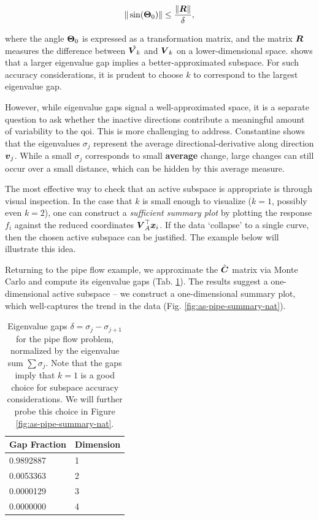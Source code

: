 \documentclass{article}
\begin{document}
\begin{equation} \label{eq:sine-bound}
  \|\sin(\boldsymbol{\Theta}_0)\| \leq \frac{\|\boldsymbol{R}\|}{\delta},
\end{equation}

\noindent where the angle $\boldsymbol{\Theta}_0$ is expressed as a transformation matrix,
and the matrix $\boldsymbol{R}$ measures the difference between $\hat{\boldsymbol{V}_k}$ and $\boldsymbol{V}_k$
on a lower-dimensional space.  shows that a larger
eigenvalue gap implies a better-approximated subspace. For such accuracy
considerations, it is prudent to choose $k$ to correspond to the largest
eigenvalue gap.

However, while eigenvalue gaps signal a well-approximated space, it is a
separate question to ask whether the inactive directions contribute a meaningful
amount of variability to the qoi. This is more challenging to address.
Constantine\cite{constantine2015} shows that the eigenvalues $\sigma_j$
represent the average directional-derivative along direction $\boldsymbol{v}_j$. While a
small $\sigma_j$ corresponds to small \textbf{average} change, large changes can
still occur over a small distance, which can be hidden by this average measure.

The most effective way to check that an active subspace is appropriate is
through visual inspection. In the case that $k$ is small enough to visualize
($k=1$, possibly even $k=2$), one can construct a \emph{sufficient summary
  plot}\cite{cook2009regression} by plotting the response $f_i$ against the
reduced coordinates $\boldsymbol{V}_{A}^{\top}\boldsymbol{x}_i$. If the data `collapse' to a single
curve, then the chosen active subspace can be justified. The example below will
illustrate this idea.

Returning to the pipe flow example, we approximate the $\hat{\boldsymbol{C}}$ matrix via
Monte Carlo and compute its eigenvalue gaps (Tab. \ref{tab:as-pipe-gaps}). The
results suggest a one-dimensional active subspace -- we construct a
one-dimensional summary plot, which well-captures the trend in the data (Fig.
\ref{fig:as-pipe-summary-nat}).

\begin{table}[!ht]
  \centering
  \begin{tabular}{@{}ll@{}}
    \hline
    Gap Fraction & Dimension\\
    \hline
    0.9892887 & 1\\
    \hline
    0.0053363 & 2\\
    \hline
    0.0000129 & 3\\
    \hline
    0.0000000 & 4\\
    \hline
  \end{tabular}
  \caption{Eigenvalue gaps $\delta = \sigma_j - \sigma_{j+1}$ for the pipe flow
    problem, normalized by the eigenvalue sum $\sum \sigma_j$. Note that the
    gaps imply that $k=1$ is a good choice for subspace accuracy considerations.
    We will further probe this choice in Figure \ref{fig:as-pipe-summary-nat}.}
  \label{tab:as-pipe-gaps}
\end{table}
\end{document}
